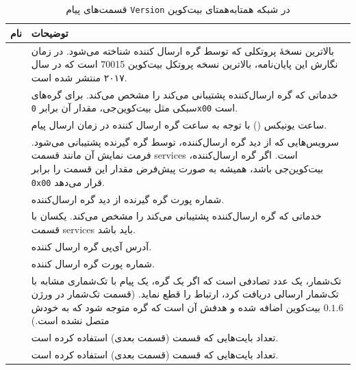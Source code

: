  	
 \begin{xltabular}{\textwidth}{|c|X|}
 	\caption{
	قسمت‌های پیام \texttt{Version} در شبکه همتا‌به‌همتای بیت‌کوین
\label{table:VersionMessage}}\\
\hline
\textbf{نام} & {\centering
	\textbf{توضیحات}		
} \\
\hline
\hline
{} & {
	بالاترین نسخهٔ پروتکلی که توسط گره ارسال کننده شناخته می‌شود.	در زمان نگارش این پایان‌نامه، بالاترین نسخه پروتکل بیت‌کوین 70015 است که در سال ۲۰۱۷ منتشر شده است.
} \\
\hline
{} & {
	خدماتی که گره ارسال‌کننده پشتیبانی می‌کند را مشخص می‌کند. برای گره‌های سبکی مثل بیت‌کوین‌جی، مقدار آن برابر \texttt{0x00} است.
} \\
\hline
{} & {
	ساعت یونیکس () با توجه به ساعت گره ارسال کننده در زمان ارسال پیام.
} \\
\hline
{} & {
	سرویس‌هایی که از دید گره ارسال‌کننده، توسط گره گیرنده پشتیبانی می‌شود. فرمت نمایش آن مانند قسمت services است. اگر گره ارسال‌کننده، بیت‌کوین‌جی باشد، همیشه به صورت پیش‌فرض مقدار این قسمت را برابر \texttt{0x00} قرار می‌دهد.
} \\
\hline
{} & {
	شماره پورت گره گیرنده از دید گره ارسال‌کننده.
}\\
\hline
{} & {
	خدماتی که گره ارسال‌کننده پشتیبانی می‌کند را مشخص می‌کند. یکسان با قسمت services باید باشد.
}\\

\hline
{} & {
	آدرس آی‌پی گره ارسال کننده.
}\\

\hline
{} & {
	شماره پورت گره ارسال کننده.
}\\

\hline
{} & {
	تک‌شمار، یک عدد تصادفی است که اگر یک گره،‌ یک پیام با تک‌شماری مشابه با تک‌شمار ارسالی دریافت کرد، ارتباط را قطع نماید. (قسمت تک‌شمار در ورژن $0.1.6$ بیت‌کوین اضافه شده و هدفش آن است که گره متوجه شود که به خودش متصل نشده است.)
	{\tiny  {}}
}\\
\hline
{} & {
	تعداد بایت‌هایی که قسمت  (قسمت بعدی) استفاده کرده است.
}\\

\hline
{} & {
	تعداد بایت‌هایی که قسمت  (قسمت بعدی) استفاده کرده است.
}\\

\hline
 \end{xltabular}

